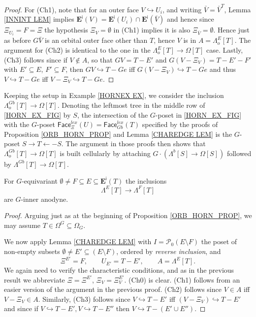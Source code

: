 \documentclass[a4paper,10pt
,draft
]{article}%
\begin{document}
\begin{proof}
For (Ch1), note that for an outer face 
$V \hookrightarrow U_i$, and writing $\bar{V} = \bar{V}^T$,
Lemma \ref{INNINT LEM} implies
$\boldsymbol{E}^{\mathsf{i}}(V) = 
\boldsymbol{E}^{\mathsf{i}}(U_i) \cap \boldsymbol{E}^{\mathsf{i}}(\bar{V})$
and hence since $\Xi_{U_i} = F = \Xi$ the 
hypothesis $\Xi_{V} = \emptyset$ in (Ch1) implies it is also
$\Xi_{\bar{V}} = \emptyset$.
Hence just as before $G\bar{V}$ is an orbital outer face other than $T$, hence $V$ is in $A=\Lambda_o^{E}[T]$.
The argument for (Ch2) is identical to the one in the
$\Lambda_o^{E}[T] \to \Omega[T]$ case.
Lastly, (Ch3) follows since	if $V \not \in A$, so that
$GV = T - E'$ and $G(V - \Xi_V) = T-E'-F'$ with
$E' \subseteq E$, $F' \subseteq F$,
then $GV \hookrightarrow T-Ge$ iff $G(V - \Xi_V) \hookrightarrow T-Ge$
and thus $V \hookrightarrow T-Ge$ iff $V - \Xi_V \hookrightarrow T-Ge$.
\end{proof}


\begin{example}
Keeping the setup in Example \ref{HORNEX EX}, we consider the inclusion $\Lambda_o^{Gb}[T] \to \Omega[T]$.
Denoting the leftmost tree in the middle row of \eqref{HORN_EX_FIG} by $S$, the intersection of the 
$G$-poset in \eqref{HORN_EX_FIG} with the $G$-poset 
$\mathsf{Face}^{lex}_{\Xi}(U)=
\mathsf{Face}^{lex}_{Gb}(T)$
specified by the proofs of Proposition \ref{ORB_HORN_PROP} and Lemma \ref{CHAREDGE LEM} is the $G$-poset
$S \to T \leftarrow -S$.
The argument in those proofs then shows that $\Lambda_o^{Gb}[T] \to \Omega[T]$ is built cellularly by attaching
$G \cdot \left(\Lambda^b[S] \to \Omega[S]\right)$
followed by $\Lambda^{Gb}[T] \to \Omega[T]$.
\end{example}


\begin{proposition}\label{REG_HORN_PROP}
For $G$-equivariant 
$\emptyset \neq F \subseteq E \subseteq 
\boldsymbol{E}^{\mathsf{i}}(T)$
the inclusions
\begin{equation}
	\Lambda^{E}[T] \to \Lambda^{F}[T]
\end{equation}
are $G$-inner anodyne.
\end{proposition}

\begin{proof}
Arguing just as at the beginning of Proposition \ref{ORB_HORN_PROP}, we may assume $T \in \Omega^G \subseteq \Omega_{G}$.

We now apply Lemma \ref{CHAREDGE LEM} with 
$I = \mathcal{P}_0(E\setminus F)$
the poset of non-empty subsets $\emptyset \neq E' \subseteq (E \setminus F)$, ordered by \textit{reverse inclusion}, and
\[
	\Xi^{E'} = F, \qquad
	U_{E'} = T - E', \qquad
	A=\Lambda^{E}[T].
\]
We again need to verify the characteristic conditions,
and as in the previous result we abbreviate
$\Xi = \Xi^{E'}$, $\Xi_V = \Xi^{E'}_V$.
(Ch0) is clear. (Ch1) follows from an easier version of the argument in the previous proof.
(Ch2) follows since $V \in A$ iff $V-\Xi_V \in A$.
Similarly,
(Ch3) follows since 
$V \hookrightarrow T-E'$ iff $(V-\Xi_V) \hookrightarrow T-E'$
and since if
$V \hookrightarrow T-E',V \hookrightarrow T-E''$
then 
$V \hookrightarrow T-(E' \cup E'')$.
\end{proof}
\end{document}
